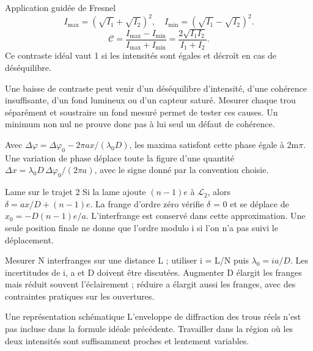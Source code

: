 \begin{loi}{Application guidée de Fresnel}
\[I_{\max}=(\sqrt{I_1}+\sqrt{I_2})^2,\quad I_{\min}=(\sqrt{I_1}-\sqrt{I_2})^2.\]\[\mathcal C=\frac{I_{\max}-I_{\min}}{I_{\max}+I_{\min}}=\frac{2\sqrt{I_1I_2}}{I_1+I_2}.\]Ce contraste idéal vaut 1 si les intensités sont égales et décroît en cas de déséquilibre.
\end{loi}
Une baisse de contraste peut venir d’un déséquilibre d’intensité, d’une cohérence insuffisante, d’un fond lumineux ou d’un capteur saturé. Mesurer chaque trou séparément et soustraire un fond mesuré permet de tester ces causes. Un minimum non nul ne prouve donc pas à lui seul un défaut de cohérence.


Avec $\Delta\varphi=\Delta\varphi_0-2\pi ax/(\lambda_0D)$, les maxima satisfont cette phase égale à 2m\ensuremath{\pi}. Une variation de phase déplace toute la figure d’une quantité $\Delta x=\lambda_0D\,\Delta\varphi_0/(2\pi a)$, avec le signe donné par la convention choisie.
\begin{methode}{Lame sur le trajet 2}
Si la lame ajoute $(n-1)e$ à $\mathcal L_2$, alors $\delta=ax/D+(n-1)e$. La frange d’ordre zéro vérifie \ensuremath{\delta} = 0 et se déplace de $x_0=-D(n-1)e/a$. L’interfrange est conservé dans cette approximation. Une seule position finale ne donne que l’ordre modulo i si l’on n’a pas suivi le déplacement.
\end{methode}
Mesurer N interfranges sur une distance L ; utiliser i = L/N puis $\lambda_0=ia/D$. Les incertitudes de i, a et D doivent être discutées. Augmenter D élargit les franges mais réduit souvent l’éclairement ; réduire a élargit aussi les franges, avec des contraintes pratiques sur les ouvertures.
\begin{docu}{Une représentation schématique}
L’enveloppe de diffraction des trous réels n’est pas incluse dans la formule idéale précédente. Travailler dans la région où les deux intensités sont suffisamment proches et lentement variables.
\end{docu}


